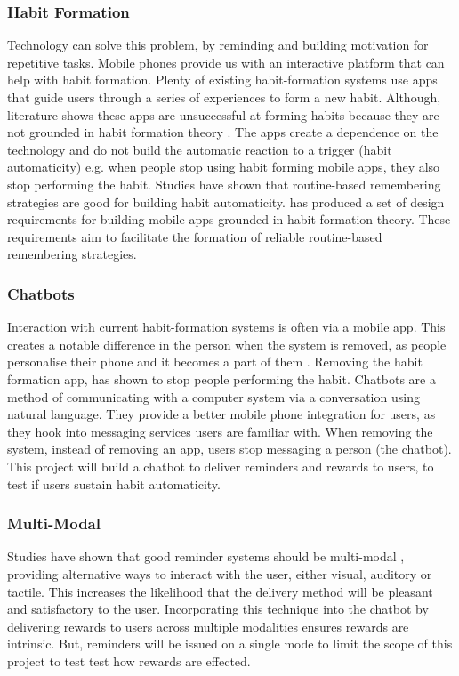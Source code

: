 \subsubsection*{Habit Formation}
Technology can solve this problem, by reminding and building motivation for repetitive tasks. Mobile phones provide us with an interactive platform that can help with habit formation. Plenty of existing habit-formation systems use apps that guide users through a series of experiences to form a new habit. Although, literature shows these apps are unsuccessful at forming habits because they are not grounded in habit formation theory \cite{article_beyond_self_tracking_designing_apps}. The apps create a dependence on the technology and do not build the automatic reaction to a trigger (habit automaticity) e.g. when people stop using habit forming mobile apps, they also stop performing the habit.\newline
\newline
Studies have shown that routine-based remembering strategies are good for building habit automaticity. \cite{article_dont_forget_your_pill} has produced a set of design requirements for building mobile apps grounded in habit formation theory. These requirements aim to facilitate the formation of reliable routine-based remembering strategies.

\subsubsection*{Chatbots}
Interaction with current habit-formation systems is often via a mobile app. This creates a notable difference in the person when the system is removed, as people personalise their phone and it becomes a part of them \cite{article_my_phone_is_part_of_my_soul}. Removing the habit formation app, has shown to stop people performing the habit.\newline
\newline
Chatbots are a method of communicating with a computer system via a conversation using natural language. They provide a better mobile phone integration for users, as they hook into messaging services users are familiar with. When removing the system, instead of removing an app, users stop messaging a person (the chatbot). This project will build a chatbot to deliver reminders and rewards to users, to test if users sustain habit automaticity.

\subsubsection*{Multi-Modal}
Studies have shown that good reminder systems should be multi-modal \cite{article_designing_multimodal_reminders_for_home}, providing alternative ways to interact with the user, either visual, auditory or tactile. This increases the likelihood that the delivery method will be pleasant and satisfactory to the user. Incorporating this technique into the chatbot by delivering rewards to users across multiple modalities ensures rewards are intrinsic. But, reminders will be issued on a single mode to limit the scope of this project to test test how rewards are effected.

